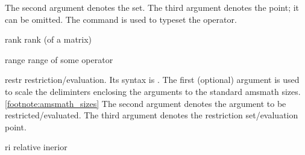 \documentclass[english,a4paper,DIV=12,parskip=full,oneside]{scrartcl}
\begin{document}
\begin{commandlist}
            The second argument denotes the set.
            The third argument denotes the point; it can be omitted.
            The command \codeCommand{\proxOp} is used to typeset the operator.
            \par\mathCodeExample{\prox}
            \par{} %
            \par{} %
            \par{} %
        \item[rank] rank (of a matrix) \mathCodeExample{\rank}
        \item[range] range of some operator \mathCodeExample{\range}
        \item[restr] restriction/evaluation.
            Its syntax is .
            The first (optional) argument is used to scale the deliminters enclosing the arguments to the standard amsmath sizes.\cref{footnote:amsmath_sizes}
            The second argument denotes the argument to be restricted/evaluated.
            The third argument denotes the restriction set/evaluation point.
            \par{}
        \item[ri] relative inerior \mathCodeExample{\ri}



\end{commandlist}
\end{document}
